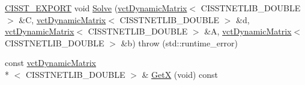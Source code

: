 \begin{DoxyCompactItemize}
\item 
\hyperlink{cmn_export_macros_8h_a99393e0c3ac434b2605235bbe20684f8}{C\-I\-S\-S\-T\-\_\-\-E\-X\-P\-O\-R\-T} void \hyperlink{classnmr_l_s_i_solver_a20d8a45ef8a1c85ba6f8ea225f8d90dd}{Solve} (\hyperlink{classvct_dynamic_matrix}{vct\-Dynamic\-Matrix}$<$ C\-I\-S\-S\-T\-N\-E\-T\-L\-I\-B\-\_\-\-D\-O\-U\-B\-L\-E $>$ \&C, \hyperlink{classvct_dynamic_matrix}{vct\-Dynamic\-Matrix}$<$ C\-I\-S\-S\-T\-N\-E\-T\-L\-I\-B\-\_\-\-D\-O\-U\-B\-L\-E $>$ \&d, \hyperlink{classvct_dynamic_matrix}{vct\-Dynamic\-Matrix}$<$ C\-I\-S\-S\-T\-N\-E\-T\-L\-I\-B\-\_\-\-D\-O\-U\-B\-L\-E $>$ \&A, \hyperlink{classvct_dynamic_matrix}{vct\-Dynamic\-Matrix}$<$ C\-I\-S\-S\-T\-N\-E\-T\-L\-I\-B\-\_\-\-D\-O\-U\-B\-L\-E $>$ \&b)  throw (std\-::runtime\-\_\-error)
\item 
const \hyperlink{classvct_dynamic_matrix}{vct\-Dynamic\-Matrix}\\*
$<$ C\-I\-S\-S\-T\-N\-E\-T\-L\-I\-B\-\_\-\-D\-O\-U\-B\-L\-E $>$ \& \hyperlink{classnmr_l_s_i_solver_a926eb92277cb37a283861ee062de4343}{Get\-X} (void) const 
\end{DoxyCompactItemize}
